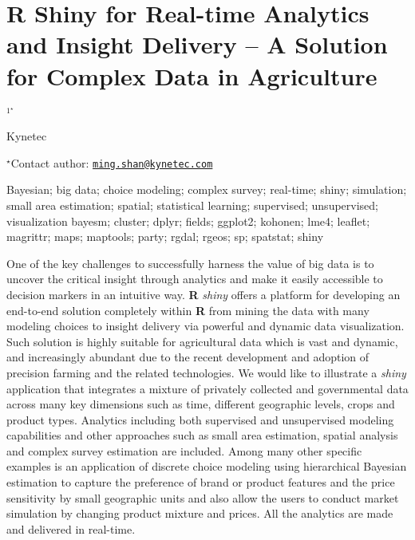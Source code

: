 \documentclass[\main/boa.tex]{subfiles}
\begin{document}
\section{R Shiny for Real-time Analytics and Insight Delivery -- A Solution for
Complex Data in Agriculture}

\begin{center}
  {\bf {}$^{1^\star}$}
\end{center}

\vskip 0.3cm

\begin{affiliations}
\begin{enumerate}
\begin{minipage}{0.915\textwidth}
\centering
\item Kynetec \\[-2pt]
\end{minipage}
\end{enumerate}
$^\star$Contact author: \href{mailto:ming.shan@kynetec.com}{\nolinkurl{ming.shan@kynetec.com}}\\
\end{affiliations}

\vskip 0.5cm

\begin{minipage}{0.915\textwidth}
\keywords Bayesian; big data; choice modeling; complex survey; real-time; shiny;
simulation; small area estimation; spatial; statistical learning;
supervised; unsupervised; visualization
\packages bayesm; cluster; dplyr; fields; ggplot2; kohonen; lme4; leaflet;
magrittr; maps; maptools; party; rgdal; rgeos; sp; spatstat; shiny
\end{minipage}

\vskip 0.8cm

One of the key challenges to successfully harness the value of big data
is to uncover the critical insight through analytics and make it easily
accessible to decision markers in an intuitive way. \textbf{R}
\emph{shiny} offers a platform for developing an end-to-end solution
completely within \textbf{R} from mining the data with many modeling
choices to insight delivery via powerful and dynamic data visualization.
Such solution is highly suitable for agricultural data which is vast and
dynamic, and increasingly abundant due to the recent development and
adoption of precision farming and the related technologies. We would
like to illustrate a \emph{shiny} application that integrates a mixture
of privately collected and governmental data across many key dimensions
such as time, different geographic levels, crops and product types.
Analytics including both supervised and unsupervised modeling
capabilities and other approaches such as small area estimation, spatial
analysis and complex survey estimation are included. Among many other
specific examples is an application of discrete choice modeling using
hierarchical Bayesian estimation to capture the preference of brand or
product features and the price sensitivity by small geographic units and
also allow the users to conduct market simulation by changing product
mixture and prices. All the analytics are made and delivered in
real-time.
\end{document}
